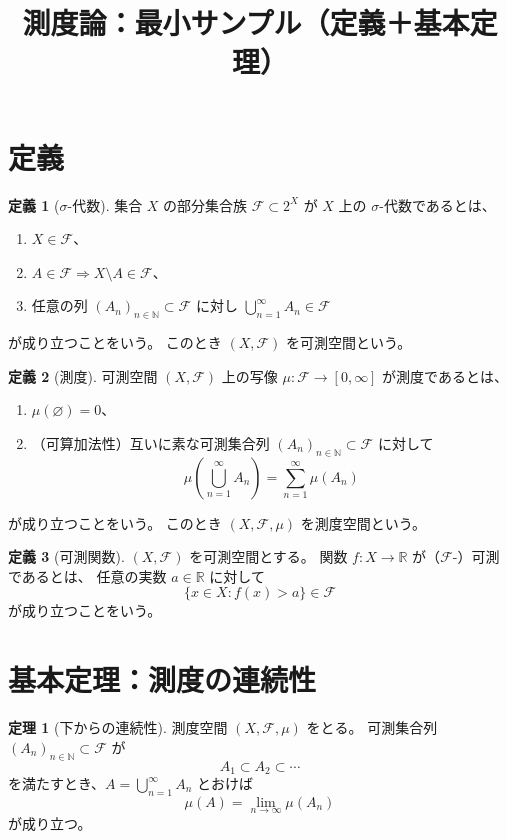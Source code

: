 \documentclass[uplatex]{jsarticle}
\theoremstyle{definition}
\newtheorem{definition}{定義}[section]
\newtheorem{theorem}{定理}[section]
\theoremstyle{remark}
\newcommand{\calF}{\mathcal{F}}
\newcommand{\R}{\mathbb{R}}
\begin{document}
\title{測度論：最小サンプル（定義＋基本定理）}
\author{}
\date{}
\maketitle

\section{定義}

\begin{definition}[$\sigma$-代数]
集合 $X$ の部分集合族 $\calF\subset 2^X$ が $X$ 上の $\sigma$-代数であるとは、
\begin{enumerate}
  \item $X\in \calF$、
  \item $A\in \calF \Rightarrow X\setminus A\in \calF$、
  \item 任意の列 $(A_n)_{n\in\mathbb{N}}\subset\calF$ に対し
        $\displaystyle \bigcup_{n=1}^{\infty}A_n\in\calF$
\end{enumerate}
が成り立つことをいう。
このとき $(X,\calF)$ を可測空間という。
\end{definition}

\begin{definition}[測度]
可測空間 $(X,\calF)$ 上の写像 $\mu:\calF\to[0,\infty]$ が測度であるとは、
\begin{enumerate}
  \item $\mu(\varnothing)=0$、
  \item （可算加法性）互いに素な可測集合列 $(A_n)_{n\in\mathbb{N}}\subset\calF$
        に対して
        \[
          \mu\!\left(\bigcup_{n=1}^{\infty}A_n\right)=\sum_{n=1}^{\infty}\mu(A_n)
        \]
\end{enumerate}
が成り立つことをいう。
このとき $(X,\calF,\mu)$ を測度空間という。
\end{definition}

\begin{definition}[可測関数]
$(X,\calF)$ を可測空間とする。
関数 $f:X\to\R$ が（$\calF$-）可測であるとは、
任意の実数 $a\in\R$ に対して
\[
  \{x\in X : f(x) > a\}\in\calF
\]
が成り立つことをいう。
\end{definition}

\section{基本定理：測度の連続性}

\begin{theorem}[下からの連続性]
測度空間 $(X,\calF,\mu)$ をとる。
可測集合列 $(A_n)_{n\in\mathbb{N}}\subset\calF$ が
\[
  A_1\subset A_2\subset \cdots
\]
を満たすとき、$A=\bigcup_{n=1}^\infty A_n$ とおけば
\[
  \mu(A)=\lim_{n\to\infty}\mu(A_n)
\]
が成り立つ。
\end{theorem}
\end{document}
